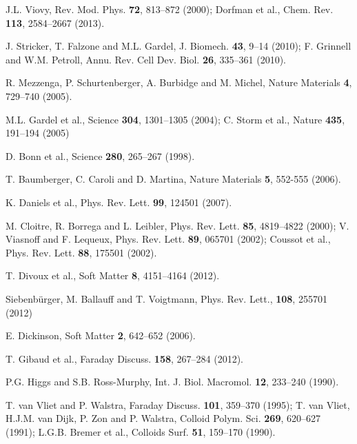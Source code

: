 \documentclass[twocolumn,superscriptaddress,showpacs,preprintnumbers,amsmath,amssymb,prl]{revtex4}
\begin{document}
\begin{thebibliography}{}

 J.L. Viovy, Rev. Mod. Phys. {\bf 72}, 813--872 (2000); Dorfman et al., Chem. Rev. {\bf 113}, 2584--2667 (2013).

 J. Stricker, T. Falzone and M.L. Gardel, J. Biomech. {\bf 43},  9--14 (2010); F. Grinnell and W.M. Petroll, Annu. Rev. Cell Dev. Biol. {\bf 26}, 335--361 (2010).

 R. Mezzenga, P. Schurtenberger, A. Burbidge and M. Michel, Nature Materials  {\bf 4}, 729--740 (2005).

 M.L. Gardel et al., Science {\bf 304}, 1301--1305 (2004); C. Storm et al., Nature {\bf 435}, 191--194 (2005)

 D. Bonn et al., Science {\bf 280}, 265--267 (1998).

 T. Baumberger, C. Caroli and D. Martina, Nature Materials {\bf 5}, 552-555 (2006).

 K. Daniels et al., Phys. Rev. Lett. {\bf 99}, 124501 (2007).


 M. Cloitre, R. Borrega and L. Leibler, Phys. Rev. Lett. {\bf 85}, 4819--4822 (2000); V. Viasnoff and F. Lequeux, Phys. Rev. Lett. {\bf 89}, 065701 (2002); Coussot et al., Phys. Rev. Lett. {\bf 88}, 175501 (2002).

 T. Divoux et al., Soft Matter {\bf 8}, 4151--4164 (2012).

 Siebenb\"urger, M. Ballauff and T. Voigtmann, Phys. Rev.
Lett., {\bf 108}, 255701 (2012)

 E. Dickinson, Soft Matter {\bf 2}, 642--652 (2006).

 T. Gibaud et al., Faraday Discuss. {\bf 158}, 267--284 (2012).

 P.G. Higgs and S.B. Ross-Murphy, Int. J. Biol. Macromol. {\bf 12}, 233--240 (1990).

 T. van Vliet and P. Walstra, Faraday Discuss. {\bf 101}, 359--370 (1995); T. van Vliet, H.J.M. van Dijk, P. Zon and P. Walstra, Colloid Polym. Sci. {\bf 269}, 620--627 (1991); L.G.B. Bremer et al., Colloids Surf. {\bf 51}, 159--170 (1990).


\end{thebibliography}
\end{document}
